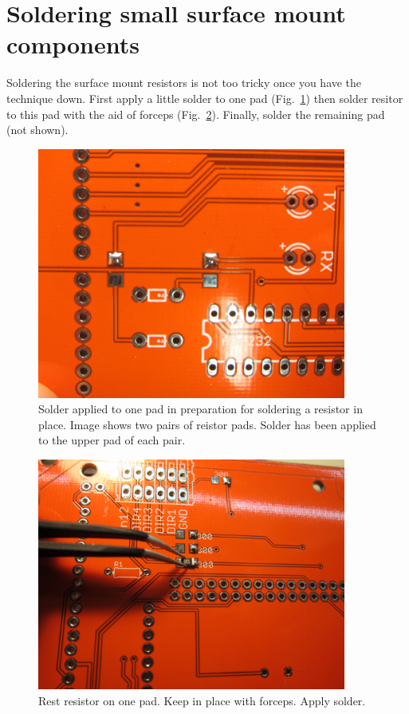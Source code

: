 \documentclass[11pt]{report} %
\begin{document}
\clearpage

\section{Soldering small surface mount components}
Soldering the surface mount resistors is not too tricky once you have the technique down. First apply a little solder to one pad (Fig.~\ref{onePad}) then solder resitor to this pad with the aid of forceps (Fig.~\ref{forceps}). Finally, solder the remaining pad (not shown). 

\begin{figure}[!ht]
\centering
\includegraphics[width=4in]{IMG_3198.JPG}
\caption{Solder applied to one pad in preparation for soldering a resistor in place. Image shows two pairs of reistor pads. Solder has been applied to the upper pad of each pair. }
\label{onePad}
\end{figure}


\begin{figure}[!ht]
\centering
\includegraphics[width=4in]{IMG_3200.JPG}
\caption{Rest resistor on one pad. Keep in place with forceps. Apply solder.}
\label{forceps}
\end{figure}
\end{document}
